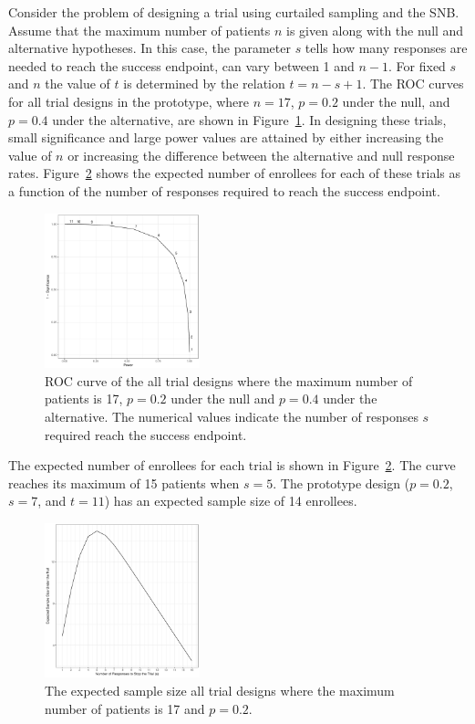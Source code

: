 \documentclass[sii]{ipart}
\begin{document}
Consider the problem of designing a trial using curtailed sampling and the SNB. Assume that the maximum number of patients $n$ is given along with the null and alternative hypotheses. In this case, the parameter $s$ tells how many responses are needed to reach the success endpoint, can vary between 1 and $n-1$. For fixed $s$ and $n$  the value of $t$ is determined by the relation $t=n-s+1$. The ROC curves for all trial designs in the prototype, where $n=17$, $p=0.2$ under the null, and $p=0.4$ under the alternative, are shown in Figure~\ref{fig:all_sample_sizes_power_vs_signif}. In designing these trials, small significance and large power values are attained by either increasing the value of $n$ or increasing the difference between the alternative and null response rates. Figure~\ref{fig:all_sample_sizes} shows the expected number of enrollees for each of these trials as a function of the number of responses required to reach the success endpoint.

\begin{figure}[htbp!]
\centering
\includegraphics[width=0.4\textwidth]{power-vs-significance.pdf}
\caption{
ROC curve of the all trial designs where the maximum number of patients is 17, $p=0.2$ under the null and $p=0.4$ under the alternative. The numerical values indicate the number of responses $s$ required reach the success endpoint.
}
\label{fig:all_sample_sizes_power_vs_signif}
\end{figure}

The expected number of enrollees for each trial is shown in Figure~\ref{fig:all_sample_sizes}. The curve reaches its maximum of 15 patients when $s=5$. The prototype design ($p=0.2$, $s=7$, and $t=11$) has an expected sample size of 14 enrollees.

\begin{figure}[htbp!]
\centering
\includegraphics[width=0.4\textwidth]{expected-sample-size.pdf}
\caption{
The expected sample size all trial designs where the maximum number
of patients is 17 and $p=0.2$.}
\label{fig:all_sample_sizes}
\end{figure}
\end{document}
